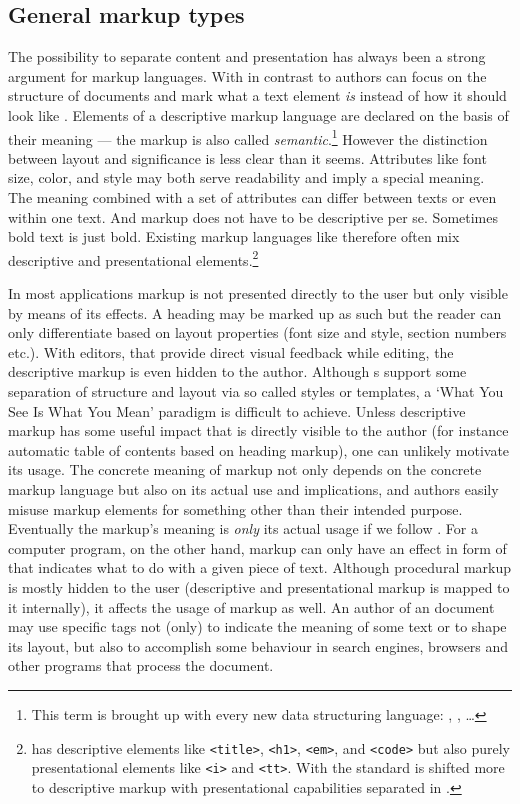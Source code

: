 \subsection{General markup types}
\label{sec:markuptypes}
The possibility to separate content and presentation has always been a strong
argument for markup languages. With  in contrast to
 authors can focus on the structure of documents
and mark what a text element \emph{is} instead of how it should look like
\cite{Coombs1987}. Elements of a descriptive markup language are declared on
the basis of their meaning --- the markup is also called
\emph{semantic}.\footnote{This
term is brought up with every new data structuring language: ,
, \ldots} However the distinction between layout and
significance is less clear than it seems. Attributes like font size, color, and
style may both serve readability and imply a special meaning. The meaning
combined with a set of attributes can differ between texts or even within one
text. And markup does not have to be descriptive per se. Sometimes bold text is
just bold. Existing markup languages like  therefore often mix
descriptive and presentational elements.\footnote{ has descriptive
elements like \texttt{<title>}, \texttt{<h1>}, \texttt{<em>}, and
\texttt{<code>} but also purely presentational elements like \texttt{<i>} and
\texttt{<tt>}. With  the standard is shifted more to descriptive
markup with presentational capabilities separated in
 \cite{Hickson2009}.}

In most applications markup is not presented directly to the user but only
visible by means of its effects. A heading may be marked up as such but the
reader can only differentiate based on layout properties (font size and
style, section numbers etc.). With  editors, that provide
direct visual feedback while editing, the descriptive markup is even hidden to
the author. Although s support some separation of structure
and layout via so called styles or templates, a `What You See Is What You
Mean' paradigm is difficult to achieve. Unless descriptive markup has some
useful impact that is directly visible to the author (for instance automatic
table of contents based on heading markup), one can unlikely motivate its usage.
The concrete meaning of markup not only depends on the concrete markup language
but also on its actual use and implications, and authors easily misuse markup
elements for something other than their intended purpose. Eventually the
markup's meaning is \emph{only} its actual usage if we follow
. For a computer program, on the other hand,
markup can only have an effect in form of  that
indicates what to do with a given piece of text. Although procedural markup
is mostly hidden to the user (descriptive and presentational markup is mapped
to it internally), it affects the usage of markup as well. An author of an
 document may use specific tags not (only) to indicate the
meaning of some text or to shape its layout, but also to accomplish some
behaviour in search engines, browsers and other programs that process the
document.

